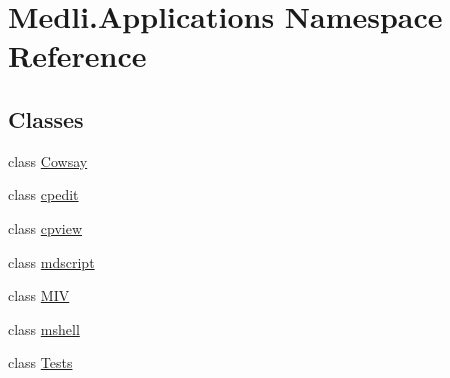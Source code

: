 \hypertarget{namespace_medli_1_1_applications}{}\section{Medli.\+Applications Namespace Reference}
\label{namespace_medli_1_1_applications}
\subsection*{Classes}
\begin{DoxyCompactItemize}
\item 
class \hyperlink{class_medli_1_1_applications_1_1_cowsay}{Cowsay}
\item 
class \hyperlink{class_medli_1_1_applications_1_1cpedit}{cpedit}
\item 
class \hyperlink{class_medli_1_1_applications_1_1cpview}{cpview}
\item 
class \hyperlink{class_medli_1_1_applications_1_1mdscript}{mdscript}
\item 
class \hyperlink{class_medli_1_1_applications_1_1_m_i_v}{M\+IV}
\item 
class \hyperlink{class_medli_1_1_applications_1_1mshell}{mshell}
\item 
class \hyperlink{class_medli_1_1_applications_1_1_tests}{Tests}
\end{DoxyCompactItemize}

